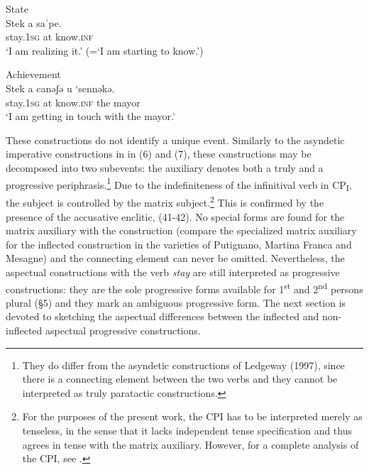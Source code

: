 \documentclass[output=paper]{langsci/langscibook}
\begin{document}
\ea%
         State\label{ex:lorusso:43}\\
    \gll Stek     a  saˈpe.     \\
         stay.\textsc{1sg} at  know.\textsc{inf}  \\
    \glt ‘I am realizing it.’ (=‘I am starting to know.’) 
\z


\ea%
         Achievement\label{ex:lorusso:44}\\
    \gll Stek     a  canəʃə   u  ‘sennəkə.\\
         stay.\textsc{1sg} at   know.\textsc{inf} the   mayor \\
    \glt ‘I am getting in touch with the mayor.’
\z

These constructions do not identify a unique event. Similarly to the asyndetic imperative constructions in  \citep{Ledgeway1997} in (6) and (7), these constructions may be decomposed into two subevents: the auxiliary denotes both a truly  and a progressive periphrasis.\footnote{They do differ from the asyndetic constructions of Ledgeway (1997), since there is a connecting element between the two verbs and they cannot be interpreted as truly paratactic constructions.} Due to the indefiniteness of the infinitival verb in CP\textsubscript{I}, the subject is controlled by the matrix subject.\footnote{For the purposes of the present work, the CPI has to be interpreted merely as tenseless, in the sense that it lacks independent tense specification and thus agrees in tense with the matrix auxiliary. However, for a complete analysis of the CPI, see \citet{Manzini2005,Manzini2007,Manzini2011Bio}.} This is confirmed by the presence of the accusative enclitic, (41-42). No special forms are found for the matrix auxiliary with the  construction (compare the specialized matrix auxiliary for the inflected construction in the varieties of Putignano, Martina Franca and Mesagne) and the connecting element can never be omitted. Nevertheless, the aspectual  constructions with the verb \textit{stay} are still interpreted as progressive constructions: they are the sole progressive forms available for 1\textsuperscript{st} and 2\textsuperscript{nd} persons plural (§5) and they mark an ambiguous progressive form. The next section is devoted to sketching the aspectual differences between the inflected and non-inflected aspectual progressive constructions. 
\end{document}
